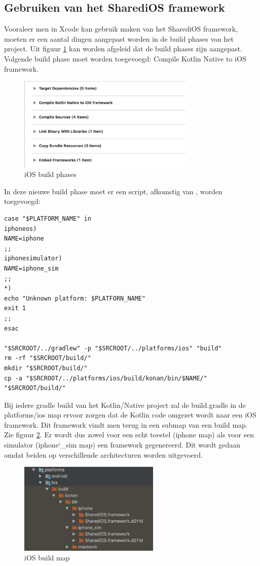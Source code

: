 \subsection{Gebruiken van het SharediOS framework}
Vooraleer men in Xcode kan gebruik maken van het SharediOS framework, moeten er een aantal dingen aangepast worden in de build phases van het project. Uit figuur \ref{fig:stap6-phases} kan worden afgeleid dat de build phases zijn aangepast. Volgende build phase moet worden toegevoegd: Compile Kotlin Native to iOS framework.
\begin{figure} [ht]
	\centering
	\includegraphics[width=0.75\textwidth]{img/stap6-phases.png}
	\caption{iOS build phases}
	\label{fig:stap6-phases}
\end{figure}

In deze nieuwe build phase moet er een script, afkomstig van \textcite{AlbertGao}, worden toegevoegd: 
\begin{lstlisting}
case "$PLATFORM_NAME" in
iphoneos)
NAME=iphone
;;
iphonesimulator)
NAME=iphone_sim
;;
*)
echo "Unknown platform: $PLATFORN_NAME"
exit 1
;;
esac

"$SRCROOT/../gradlew" -p "$SRCROOT/../platforms/ios" "build"
rm -rf "$SRCROOT/build/"
mkdir "$SRCROOT/build/"
cp -a "$SRCROOT/../platforms/ios/build/konan/bin/$NAME/" "$SRCROOT/build/"
\end{lstlisting}

Bij iedere gradle build van het Kotlin/Native project zal de build.gradle in de platforms/ios map ervoor zorgen dat de Kotlin code omgezet wordt naar een iOS framework. Dit framework vindt men terug in een submap van een build map. Zie figuur \ref{fig:stap6-build}. Er wordt dus zowel voor een echt toestel (iphone map) als voor een simulator (iphone\char`_sim map) een framework gegenereerd. Dit wordt gedaan omdat beiden op verschillende architecturen worden uitgevoerd.

\begin{figure} [ht]
	\centering
	\includegraphics[width=0.60\textwidth]{img/stap6-build.png}
	\caption{iOS build map}
	\label{fig:stap6-build}
\end{figure}

